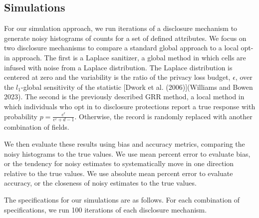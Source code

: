 \documentclass[
]{urban-formatting}
\begin{document}
\subsection{Simulations}

For our simulation approach, we run iterations of a disclosure mechanism
to generate noisy histograms of counts for a set of defined attributes.
We focus on two disclosure mechanisms to compare a standard global
approach to a local opt-in approach. The first is a Laplace sanitizer, a
global method in which cells are infused with noise from a Laplace
distribution. The Laplace distribution is centered at zero and the
variability is the ratio of the privacy loss budget, \(\epsilon\), over
the \(l_1\)-global sensitivity of the statistic {[}Dwork et al.
(2006){]}(Williams and Bowen 2023). The second is the previously
described GRR method, a local method in which individuals who opt in to
disclosure protections report a true response with probability
\(p = \frac{e^\epsilon}{e^\epsilon + d - 1}\). Otherwise, the record is
randomly replaced with another combination of fields.~

We then evaluate these results using bias and accuracy metrics,
comparing the noisy histograms to the true values. We use mean percent
error to evaluate bias, or the tendency for noisy estimates to
systematically move in one direction relative to the true values. We use
absolute mean percent error to evaluate accuracy, or the closeness of
noisy estimates to the true values.~

The specifications for our simulations are as follows. For each
combination of specifications, we run 100 iterations of each disclosure
mechanism.
\end{document}
